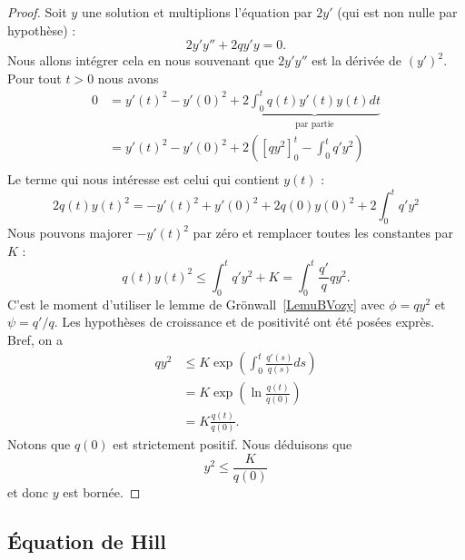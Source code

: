 \begin{proof}
	Soit \( y\) une solution et multiplions l'équation par \( 2y'\) (qui est non nulle par hypothèse) :
	\begin{equation}
		2y'y''+2qy'y=0.
	\end{equation}
	Nous allons intégrer cela en nous souvenant que \( 2y'y''\) est la dérivée de \( (y')^2\). Pour tout \( t>0\) nous avons
	\begin{subequations}
		\begin{align}
			0 & =y'(t)^2-y'(0)^2+2\underbrace{\int_0^tq(t)y'(t)y(t)dt}_{\text{par partie}} \\
			  & =y'(t)^2-y'(0)^2+2\left( [qy^2]_0^t-\int_0^tq'y^2 \right)                  \\
		\end{align}
	\end{subequations}
	Le terme qui nous intéresse est celui qui contient \( y(t)\) :
	\begin{equation}
		2q(t)y(t)^2=-y'(t)^2+y'(0)^2+2q(0)y(0)^2+2\int_0^t q'y^2
	\end{equation}
	Nous pouvons majorer \( -y'(t)^2\) par zéro et remplacer toutes les constantes par \( K\) :
	\begin{equation}
		q(t)y(t)^2\leq\int_0^tq'y^2+K=\int_0^t\frac{ q' }{ q }qy^2.
	\end{equation}
	C'est le moment d'utiliser le lemme de Grönwall~\ref{LemuBVozy} avec \( \phi=qy^2\) et \( \psi=q'/q\). Les hypothèses de croissance et de positivité ont été posées exprès. Bref, on a
	\begin{subequations}
		\begin{align}
			qy^2 & \leq K\exp\left( \int_0^t\frac{ q'(s) }{ q(s) }ds \right) \\
			     & =K\exp\left( \ln\frac{ q(t) }{ q(0) } \right)             \\
			     & =K\frac{ q(t) }{ q(0) }.
		\end{align}
	\end{subequations}
	Notons que \( q(0)\) est strictement positif. Nous déduisons que
	\begin{equation}
		y^2\leq \frac{ K }{ q(0) }
	\end{equation}
	et donc \( y\) est bornée.
\end{proof}

\subsection{Équation de Hill}
\label{SubSecDWwVVPa}

